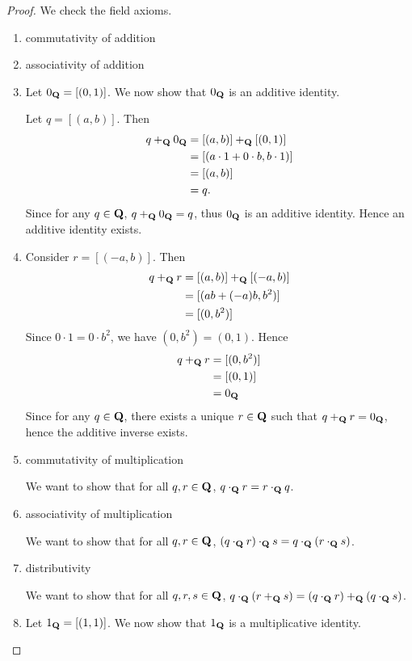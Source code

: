 \begin{proof}
We check the field axioms.
\begin{enumerate}[label=(\roman*)]
\item commutativity of addition
\item associativity of addition
\item Let $0_\mathbf Q=[(0,1)]$. We now show that $0_\mathbf Q$ is an additive identity.

Let $q=[(a,b)]$. Then
\begin{align*}
q+_\mathbf Q 0_\mathbf Q&=[(a,b)]+_\mathbf Q[(0,1)]\\
&=[(a\cdot1+0\cdot b,b\cdot1)]\\
&=[(a,b)]\\
&=q.
\end{align*}
Since for any $q\in\mathbf Q$, $q+_\mathbf Q0_\mathbf Q=q$, thus $0_\mathbf Q$ is an additive identity. Hence an additive identity exists.

\item Consider $r=[(-a,b)]$. Then
\begin{align*}
q+_\mathbf Q r&=[(a,b)]+_\mathbf Q[(-a,b)]\\
&=[(ab+(-a)b,b^2)]\\
&=[(0,b^2)]
\end{align*}
Since $0\cdot1=0\cdot b^2$, we have $(0,b^2)=(0,1)$. Hence 
\begin{align*}
q+_\mathbf Q r&=[(0,b^2)]\\
&=[(0,1)]\\
&=0_\mathbf Q
\end{align*}
Since for any $q\in\mathbf Q$, there exists a unique $r\in\mathbf Q$ such that $q+_\mathbf Q r=0_\mathbf Q$, hence the additive inverse exists.

\item commutativity of multiplication

We want to show that for all $q,r\in\mathbf Q$, $q\cdot_\mathbf Q r=r\cdot_\mathbf Q q$.

\item associativity of multiplication

We want to show that for all $q,r\in\mathbf Q$, $(q\cdot_\mathbf Q r)\cdot_\mathbf Q s=q\cdot_\mathbf Q(r\cdot_\mathbf Q s)$.

\item distributivity

We want to show that for all $q,r,s\in\mathbf Q$, $q\cdot_\mathbf Q(r+_\mathbf Q s)=(q\cdot_\mathbf Q r)+_\mathbf Q(q\cdot_\mathbf Q s)$.

\item Let $1_\mathbf Q=[(1,1)]$. We now show that $1_\mathbf Q$ is a multiplicative identity.


\end{enumerate}
\end{proof}
